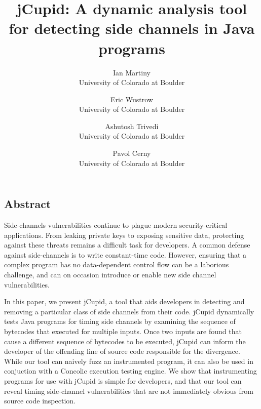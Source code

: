 \documentclass[letterpaper,twocolumn,10pt]{article}
\begin{document}
\date{}

\title{\Large \bf jCupid: A dynamic analysis tool for detecting side channels in Java programs}

\author{
{\rm Ian Martiny}\\
University of Colorado at Boulder
\and
{\rm Eric Wustrow}\\
University of Colorado at Boulder
\and
{\rm Ashutosh Trivedi}\\
University of Colorado at Boulder
\and
{\rm Pavol Cerny}\\
University of Colorado at Boulder
} %

\maketitle

\thispagestyle{empty}


\subsection*{Abstract}

Side-channels vulnerabilities continue to plague modern
security-critical applications. From leaking private keys to exposing sensitive data,
protecting against these threats remains a difficult task for developers.
A common defense against side-channels is to write constant-time code. However,
ensuring that a complex program has no data-dependent control flow can be a laborious
challenge, and can on occasion introduce or enable new side channel
vulnerabilities.

In this paper, we present jCupid, a tool that aids developers in detecting and
removing a particular class of side channels from their code. jCupid dynamically
tests Java programs for timing side channels by examining the sequence of
bytecodes that executed for multiple inputs.  Once two inputs are found that cause
a different sequence of bytecodes to be executed, jCupid can inform the developer of the
offending line of source code responsible for the divergence. While our tool can
naively fuzz an instrumented program, it can also be used in conjuction with a
Concolic execution testing engine. We show that instrumenting programs for use
with jCupid is simple for developers, and that our tool can reveal
timing side-channel vulnerabilities that are not immediately obvious from source
code inspection.
\end{document}
